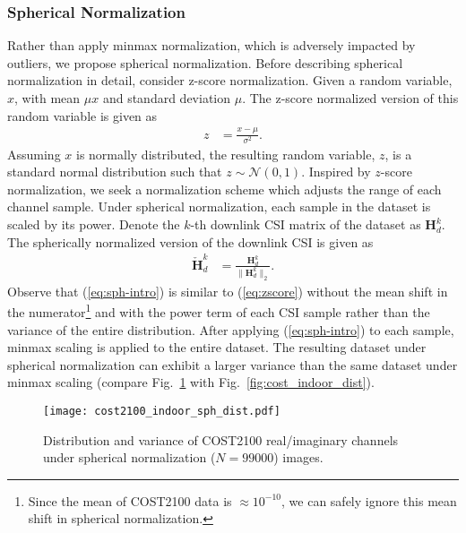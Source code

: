 
\subsubsection{Spherical Normalization}
\label{sect:sph_norm_method}
Rather than apply minmax normalization, which is adversely impacted by outliers, we propose spherical normalization. Before describing spherical normalization in detail, consider z-score normalization. Given a random variable, $x$, with mean $\mu x$ and standard deviation $\mu$. The z-score normalized version of this random variable is given as
\begin{align}
	z &= \frac{x - \mu}{\sigma^2}. \label{eq:zscore}
\end{align}
Assuming $x$ is normally distributed, the resulting random variable, $z$, is a standard normal distribution such that $z \sim \mathcal N(0,1)$. Inspired by $z$-score normalization, we seek a normalization scheme which adjusts the range of each channel sample. Under spherical normalization, each sample in the dataset is scaled by its power. Denote the $k$-th downlink CSI matrix of the dataset as $\mathbf H_d^k$. The spherically normalized version of the downlink CSI is given as
\begin{align}
	\mathbf{\check H}_d^k &= \frac{\mathbf H_d^k}{\|\mathbf H_d^k\|_2}. \label{eq:sph-intro}
\end{align}
Observe that (\ref{eq:sph-intro}) is similar to (\ref{eq:zscore}) without the mean shift in the numerator\footnote{Since the mean of COST2100 data is $\approx 10^{-10}$, we can safely ignore this mean shift in spherical normalization.} and with the power term of each CSI sample rather than the variance of the entire distribution. After applying (\ref{eq:sph-intro}) to each sample, minmax scaling is applied to the entire dataset. The resulting dataset under spherical normalization can exhibit a larger variance than the same dataset under minmax scaling (compare Fig.~\ref{fig:cost_indoor_sph_dist} with Fig.~\ref{fig:cost_indoor_dist}). 
\begin{figure}[htb]
	\centering
	\texttt{[image: cost2100\_indoor\_sph\_dist.pdf]}
	\medskip
	\caption{Distribution and variance of COST2100 real/imaginary channels under spherical normalization ($N=99000$) images.}
	\label{fig:cost_indoor_sph_dist}
\end{figure}
